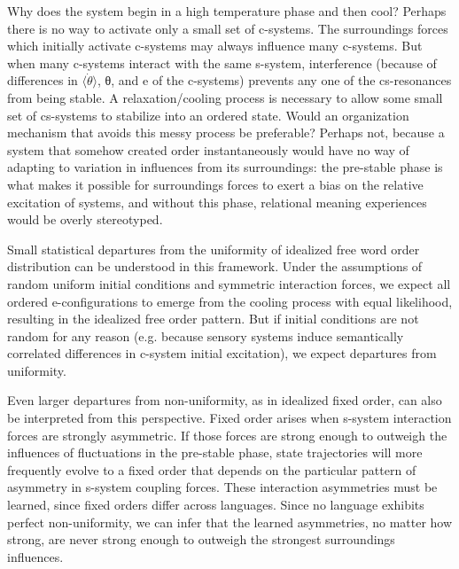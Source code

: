   Why does the system begin in a high temperature phase and then cool? Perhaps there is no way to activate only a small set of c-systems. The surroundings forces which initially activate c-systems may always influence many c-systems. But when many c-systems interact with the same s-system, interference (because of differences in $\langle\dot{\theta}\rangle$, θ, and e of the c-systems) prevents any one of the cs-resonances from being stable. A relaxation/cooling process is necessary to allow some small set of cs-systems to stabilize into an ordered state. Would an organization mechanism that avoids this messy process be preferable? Perhaps not, because a system that somehow created order instantaneously would have no way of adapting to variation in influences from its surroundings: the pre-stable phase is what makes it possible for surroundings forces to exert a bias on the relative excitation of systems, and without this phase, relational meaning experiences would be overly stereotyped.

Small statistical departures from the uniformity of idealized free word order distribution can be understood in this framework. Under the assumptions of random uniform initial conditions and symmetric interaction forces, we expect all ordered e-configurations to emerge from the cooling process with equal likelihood, resulting in the idealized free order pattern. But if initial conditions are not random for any reason (e.g. because sensory systems induce semantically correlated differences in c-system initial excitation), we expect departures from uniformity.

  Even larger departures from non-uniformity, as in idealized fixed order, can also be interpreted from this perspective. Fixed order arises when s-system interaction forces are strongly asymmetric. If those forces are strong enough to outweigh the influences of fluctuations in the pre-stable phase, state trajectories will more frequently evolve to a fixed order that depends on the particular pattern of asymmetry in s-system coupling forces. These interaction asymmetries must be learned, since fixed orders differ across languages. Since no language exhibits perfect non-uniformity, we can infer that the learned asymmetries, no matter how strong, are never strong enough to outweigh the strongest surroundings influences.

